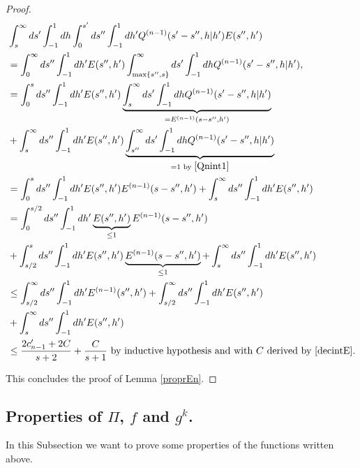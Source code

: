 \documentclass[a4paper,10pt,reqno]{amsart}
\numberwithin{equation}{subsection}
\numberwithin{figure}{subsection}
\begin{document}
\begin{proof}
\begin{align*}
&\int_s^{\infty}ds'\int_{-1}^1dh\int_0^{s'}ds''\int_{-1}^1dh'Q^{(n-1)}(s'-s'',h|h')E(s'',h')
\\
&=\int_0^{\infty}ds''\int_{-1}^1dh'E(s'',h')\int_{\max\{s'',s\}}^{\infty}ds' \int_{-1}^1dhQ^{(n-1)}(s'-s'',h|h'),
\\
&=\int_0^sds''\int_{-1}^1dh'E(s'',h')\underbrace{\int_s^{\infty}ds' \int_{-1}^1dhQ^{(n-1)}(s'-s'',h|h')}_{=E^{(n-1)}(s-s'',h')}
\\
&+\int_s^{\infty}ds''\int_{-1}^1dh'E(s'',h')\underbrace{\int_{s''}^{\infty}ds' \int_{-1}^1dhQ^{(n-1)}(s'-s'',h|h')}_{=1\textrm{ by }\eqref{Qnint1}}
\\
&=\int_0^sds''\int_{-1}^1dh'E(s'',h')E^{(n-1)}(s-s'',h')+\int_s^{\infty}ds''\int_{-1}^1dh'E(s'',h')
\\
&=\int_0^{s/2}ds''\int_{-1}^1dh'\underbrace{E(s'',h')}_{\leq1}E^{(n-1)}(s-s'',h')
\\
&+\int_{s/2}^sds''\int_{-1}^1dh'E(s'',h')\underbrace{E^{(n-1)}(s-s'',h')}_{\leq1}+\int_s^{\infty}ds''\int_{-1}^1dh'E(s'',h')
\\
&\leq\int_{s/2}^{\infty}ds''\int_{-1}^1dh'E^{(n-1)}(s'',h')+\int_{s/2}^{\infty}ds''\int_{-1}^1dh'E(s'',h')
\\
&+\int_s^{\infty}ds''\int_{-1}^1dh'E(s'',h')
\\
&\leq\frac{2c_{n-1}'+2C}{s+2}+\frac{C}{s+1}\textrm{ by inductive hypothesis and with }C\textrm{ derived by }\eqref{decintE}.
\end{align*}

This concludes the proof of Lemma \ref{proprEn}.
\end{proof}
\subsection{Properties of $\Pi$, $f$ and $g^k$.}
In this Subsection we want to prove some properties of the functions written above.
\newline
\end{document}

